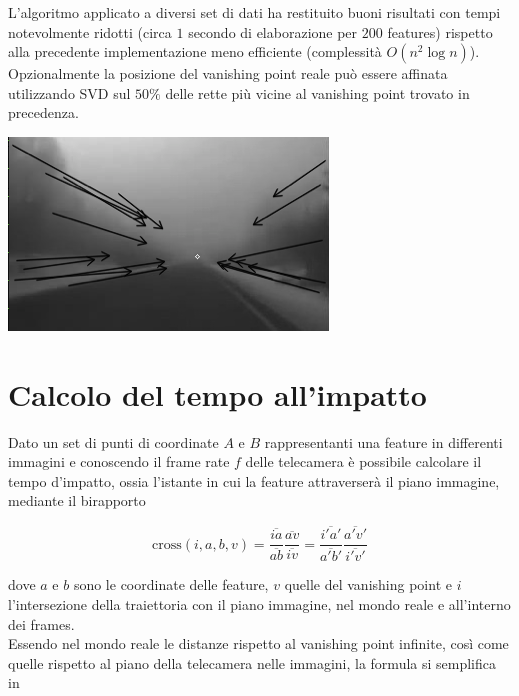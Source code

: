 \documentclass[12pt]{report}
\begin{document}
\noindent L'algoritmo applicato a diversi set di dati ha restituito buoni risultati con tempi notevolmente ridotti (circa $1$ secondo di elaborazione per $200$ features) rispetto alla precedente implementazione meno efficiente (complessit\`a $O\left(n^2\log{n}\right)$).\\

\noindent Opzionalmente la posizione del vanishing point reale pu\`o essere affinata utilizzando SVD sul $50\%$ delle rette pi\`u vicine al vanishing point trovato in precedenza.\\

\begin{center}
	\includegraphics[scale=0.7]{images/iaasAfterArrow.png}
	\label{fig:vpAftArr}
\end{center}

\section{Calcolo del tempo all'impatto}

\noindent Dato un set di punti di coordinate $A$ e $B$ rappresentanti una feature in differenti immagini e conoscendo il frame rate $f$ delle telecamera \`e possibile calcolare il tempo d'impatto, ossia l'istante in cui la feature attraverser\`a il piano immagine, mediante il birapporto

$$ \text{cross}\left(i,a,b,v\right) = \frac{\overline{ia}}{\overline{ab}}\frac{\overline{av}}{\overline{iv}} = \frac{\overline{i'a'}}{\overline{a'b'}}\frac{\overline{a'v'}}{\overline{i'v'}} $$

\noindent dove $a$ e $b$ sono le coordinate delle feature, $v$ quelle del vanishing point e $i$ l'intersezione della traiettoria con il piano immagine, nel mondo reale e all'interno dei frames.\\
\noindent Essendo nel mondo reale le distanze rispetto al vanishing point infinite, cos\`i come quelle rispetto al piano della telecamera nelle immagini, la formula si semplifica in
\end{document}
